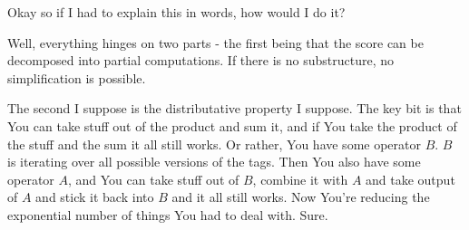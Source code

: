 \documentclass{article}
\begin{document}
	Okay so if I had to explain this in words, how would I do it?
	
	Well, everything hinges on two parts - the first being that the score can be decomposed into partial computations. If there is no substructure, no simplification is possible. 
	
	The second I suppose is the distributative property I suppose. The key bit is that You can take stuff out of the product and sum it, and if You take the product of the stuff and the sum it all still works. Or rather, You have some operator $B$. $B$ is iterating over all possible versions of the tags. Then You also have some operator $A$, and You can take stuff out of $B$, combine it with $A$ and take output of $A$ and stick it back into $B$ and it all still works. Now You're reducing the exponential number of things You had to deal with. Sure.
	
	
	
	
	
	
	
	
\end{document}
